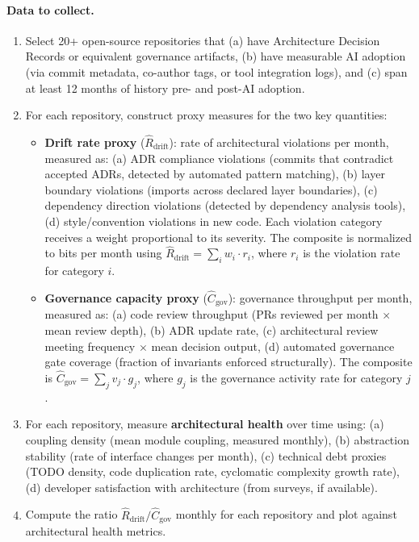 \paragraph{Data to collect.}
\begin{enumerate}[nosep]
    \item Select 20+ open-source repositories that (a) have Architecture Decision Records or equivalent governance artifacts, (b) have measurable AI adoption (via commit metadata, co-author tags, or tool integration logs), and (c) span at least 12 months of history pre- and post-AI adoption.
    \item For each repository, construct proxy measures for the two key quantities:
    \begin{itemize}[nosep]
        \item \textbf{Drift rate proxy} ($\hat{R}_{\text{drift}}$): rate of architectural violations per month, measured as: (a) ADR compliance violations (commits that contradict accepted ADRs, detected by automated pattern matching), (b) layer boundary violations (imports across declared layer boundaries), (c) dependency direction violations (detected by dependency analysis tools), (d) style/convention violations in new code. Each violation category receives a weight proportional to its severity. The composite is normalized to bits per month using $\hat{R}_{\text{drift}} = \sum_i w_i \cdot r_i$, where $r_i$ is the violation rate for category $i$.
        \item \textbf{Governance capacity proxy} ($\hat{C}_{\text{gov}}$): governance throughput per month, measured as: (a) code review throughput (PRs reviewed per month $\times$ mean review depth), (b) ADR update rate, (c) architectural review meeting frequency $\times$ mean decision output, (d) automated governance gate coverage (fraction of invariants enforced structurally). The composite is $\hat{C}_{\text{gov}} = \sum_j v_j \cdot g_j$, where $g_j$ is the governance activity rate for category $j$.
    \end{itemize}
    \item For each repository, measure \textbf{architectural health} over time using: (a) coupling density (mean module coupling, measured monthly), (b) abstraction stability (rate of interface changes per month), (c) technical debt proxies (TODO density, code duplication rate, cyclomatic complexity growth rate), (d) developer satisfaction with architecture (from surveys, if available).
    \item Compute the ratio $\hat{R}_{\text{drift}} / \hat{C}_{\text{gov}}$ monthly for each repository and plot against architectural health metrics.
\end{enumerate}

